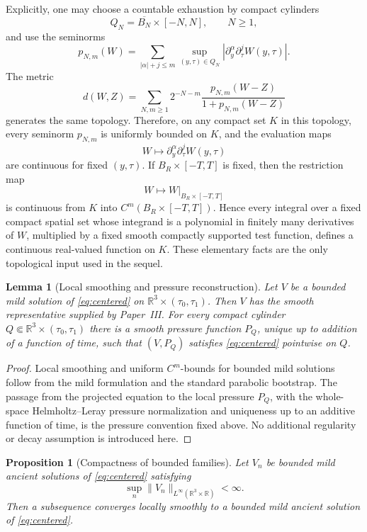 \documentclass[11pt]{amsart}
\theoremstyle{plain}
\newtheorem{proposition}[theorem]{Proposition}
\newtheorem{lemma}[theorem]{Lemma}
\theoremstyle{definition}
\theoremstyle{remark}
\numberwithin{equation}{section}
\begin{document}
Explicitly, one may choose a countable exhaustion by compact cylinders
\[
   Q_N=\overline{B_N}\times[-N,N],\qquad N\ge1,
\]
and use the seminorms
\[
   p_{N,m}(W)
   =
   \sum_{|\alpha|+j\le m}
   \sup_{(y,\tau)\in Q_N}
   |\partial_y^\alpha\partial_\tau^j W(y,\tau)|.
\]
The metric
\[
   d(W,Z)=
   \sum_{N,m\ge1}2^{-N-m}
   \frac{p_{N,m}(W-Z)}{1+p_{N,m}(W-Z)}
\]
generates the same topology.  Therefore, on any compact set \(K\) in this
topology, every seminorm \(p_{N,m}\) is uniformly bounded on \(K\), and the
evaluation maps
\[
   W\mapsto \partial_y^\alpha\partial_\tau^jW(y,\tau)
\]
are continuous for fixed \((y,\tau)\).  If \(B_R\times[-T,T]\) is fixed, then
the restriction map
\[
   W\mapsto W|_{B_R\times[-T,T]}
\]
is continuous from \(K\) into \(C^m(B_R\times[-T,T])\).  Hence every
integral over a fixed compact spatial set whose integrand is a polynomial in
finitely many derivatives of \(W\), multiplied by a fixed smooth compactly
supported test function, defines a continuous real-valued function on \(K\).
These elementary facts are the only topological input used in the sequel.

\begin{lemma}[Local smoothing and pressure reconstruction]\label{lem:classical-local}
Let \(V\) be a bounded mild solution of \eqref{eq:centered} on
\(\mathbb R^3\times(\tau_0,\tau_1)\).  Then \(V\) has the smooth
representative supplied by Paper~III.  For every compact cylinder
\(Q\Subset\mathbb R^3\times(\tau_0,\tau_1)\) there is a smooth pressure
function \(P_Q\), unique up to addition of a function of time, such that
\((V,P_Q)\) satisfies \eqref{eq:centered} pointwise on \(Q\).
\end{lemma}

\begin{proof}
Local smoothing and uniform \(C^m\)-bounds for bounded mild solutions follow
from the mild formulation and the standard parabolic bootstrap.  The passage
from the projected equation to the local pressure \(P_Q\), with the whole-space
Helmholtz--Leray pressure normalization and uniqueness up to an additive
function of time, is the pressure convention fixed above.  No additional
regularity or decay assumption is introduced here.
\end{proof}

\begin{proposition}[Compactness of bounded families]\label{prop:bounded-compactness}
Let \(V_n\) be bounded mild ancient solutions of \eqref{eq:centered} satisfying
\[
   \sup_n\|V_n\|_{L^\infty(\mathbb R^3\times\mathbb R)}<\infty .
\]
Then a subsequence converges locally smoothly to a bounded mild ancient
solution of \eqref{eq:centered}.
\end{proposition}
\end{document}
